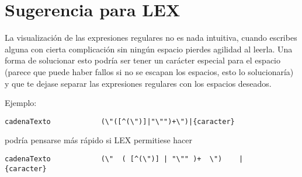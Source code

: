 \documentclass[11pt,spanish]{article} %
\begin{document}
\section{Sugerencia para LEX}
La visualización de las expresiones regulares no es nada intuitiva, cuando escribes alguna con cierta complicación sin ningún espacio pierdes agilidad al leerla.
Una forma de solucionar esto podría ser tener un carácter especial para el espacio (parece que puede haber fallos si no se escapan los espacios, esto lo solucionaría) y que te dejase separar las expresiones regulares con los espacios deseados.

Ejemplo:
\begin{lstlisting}
cadenaTexto            (\"([^(\")]|"\"")+\")|{caracter}
\end{lstlisting}
podría pensarse más rápido si LEX permitiese hacer
\begin{lstlisting}
cadenaTexto            (\"  ( [^(\")] | "\"" )+  \")    |    {caracter} 
\end{lstlisting}


\end{document}
